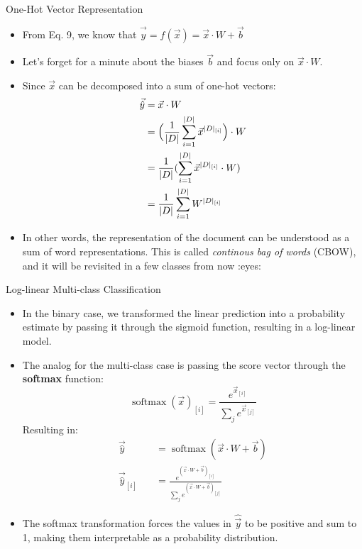 \documentclass[handout]{beamer}
\begin{document}
\begin{frame}{One-Hot Vector Representation}
\begin{scriptsize}
\begin{itemize}
    \item From Eq. 9, we know that $\vec{\hat{y}} = f(\vec{x}) = \vec{x} \cdot W + \vec{b}$
    \item Let's forget for a minute about the biases $\vec{b}$ and focus only on $\vec{x} \cdot W$.
    \item Since $\vec{x}$ can be decomposed into a sum of one-hot vectors:
    \begin{equation}
    \begin{aligned}
        \vec{\hat{y}} &= \vec{x} \cdot W \\ 
        &= \Bigl(\frac{1}{|D|} \sum_{i=1}^{|D|}\vec{x}^{|D|_{[i]}} \Bigr) \cdot W \\
        &= \frac{1}{|D|} (\sum_{i=1}^{|D|}\vec{x}^{|D|_{[i]}} \cdot W)  \\
        &= \frac{1}{|D|} \sum_{i=1}^{|D|}W^{|D|_{[i]}}
    \end{aligned}
    \end{equation}
    \item In other words, the representation of the document can be understood as a sum of word representations. This is called \textit{continous bag of words} (CBOW), and it will be revisited in a few classes from now :eyes:
\end{itemize}
\end{scriptsize}
\end{frame}


\begin{frame}{Log-linear Multi-class Classification}

\begin{scriptsize}
\begin{itemize}
\item In the binary case, we transformed the linear prediction into a probability estimate by passing it through the sigmoid function, resulting in a log-linear model.
\item The analog for the multi-class case is passing the score vector through the \textbf{softmax} function:
\begin{equation}
 \operatorname{softmax}(\vec{x})_{[i]} = \frac{e^{\vec{x}_{[i]}}}{\sum_j e^{\vec{x}_{[j]}}}
\end{equation}
Resulting in:
\begin{equation}
\begin{split}
\vec{\hat{y}} \quad & =  \operatorname{softmax}(\vec{x} \cdot W + \vec{b})  \\
\vec{\hat{y}}_{[i]} \quad & = \frac{e^{(\vec{x} \cdot W + \vec{b})_{[i]}}}{\sum_j e^{(\vec{x} \cdot W + \vec{b})_{[j]}}}
\end{split}
\end{equation}
\item The softmax transformation forces the values in $\hat{\vec{y}}$ to be positive and sum to 1, making them interpretable as a probability distribution.
\end{itemize}
\end{scriptsize}
\end{frame}
\end{document}
